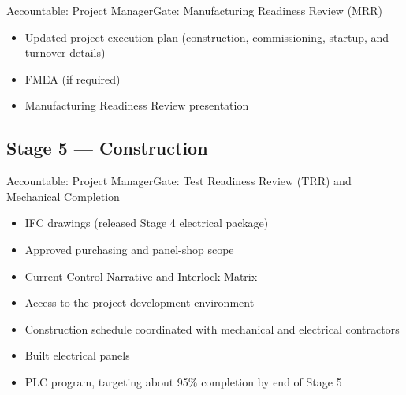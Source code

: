 \begin{stagecard}{Accountable: Project Manager}{Gate: Manufacturing Readiness Review (MRR)}
\begin{minipage}[t]{0.485\linewidth}
\begin{itemize}[leftmargin=*,itemsep=1pt,topsep=2pt]
  \item Updated project execution plan (construction, commissioning, startup, and turnover details)
  \item FMEA (if required)
  \item Manufacturing Readiness Review presentation
\end{itemize}
\end{minipage}
\tcbline
{}
\end{stagecard}

\subsection{Stage 5 --- Construction}
\begin{stagecard}{Accountable: Project Manager}{Gate: Test Readiness Review (TRR) and Mechanical Completion}
\tcbline
\begin{minipage}[t]{0.485\linewidth}
\begin{itemize}[leftmargin=*,itemsep=1pt,topsep=2pt]
  \item IFC drawings (released Stage 4 electrical package)
  \item Approved purchasing and panel-shop scope
  \item Current Control Narrative and Interlock Matrix
  \item Access to the project development environment
  \item Construction schedule coordinated with mechanical and electrical contractors
\end{itemize}
\end{minipage}\hfill
\begin{minipage}[t]{0.485\linewidth}
\begin{itemize}[leftmargin=*,itemsep=1pt,topsep=2pt]
  \item Built electrical panels
  \item PLC program, targeting about 95\% completion by end of Stage 5

\end{itemize}
\end{minipage}
\end{stagecard}
